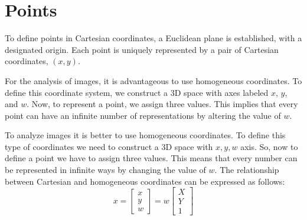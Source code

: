\section{Points}

To define points in Cartesian coordinates, a Euclidean plane is established, with a designated origin. 
Each point is uniquely represented by a pair of Cartesian coordinates, $(x, y)$.

For the analysis of images, it is advantageous to use homogeneous coordinates.
To define this coordinate system, we construct a 3D space with axes labeled $x$, $y$, and $w$. 
Now, to represent a point, we assign three values. 
This implies that every point can have an infinite number of representations by altering the value of $w$.

To analyze images it is better to use homogeneous coordinates. To define this type of coordinates we need to construct a 3D space with $x,y,w$ axis. So, now to define a point
we have to assign three values. This means that every number can be represented in infinite ways by changing the value of $w$. 
The relationship between Cartesian and homogeneous coordinates can be expressed as follows:
\[
x=
\begin{bmatrix}
    x \\
    y \\
    w 
\end{bmatrix}
=w
\begin{bmatrix}
    X \\
    Y \\
    1 
\end{bmatrix}
\]

